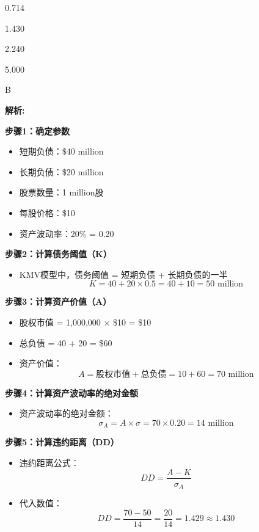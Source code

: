 \documentclass{article}
\newenvironment{explanation}
{\textbf{解析:}\par}
{\par}
\begin{document}
\begin{choices}
    \item 0.714
    \item 1.430
    \item 2.240
    \item 5.000
\end{choices}

\begin{correctanswer}
    B
\end{correctanswer}

\begin{explanation}
   
    
    \textbf{步骤1：确定参数}
    \begin{itemize}
        \item 短期负债：\$40 million
        \item 长期负债：\$20 million
        \item 股票数量：1 million股
        \item 每股价格：\$10
        \item 资产波动率：20\% = 0.20
    \end{itemize}

    \textbf{步骤2：计算债务阈值（K）}
    \begin{itemize}
        \item KMV模型中，债务阈值 = 短期负债 + 长期负债的一半
        \[
        K = 40 + 20 \times 0.5 = 40 + 10 = 50 \text{ million}
        \]
    \end{itemize}

    \textbf{步骤3：计算资产价值（A）}
    \begin{itemize}
        \item 股权市值 = 1{,}000{,}000 × \$10 = \$10 
        \item 总负债 = 40 + 20 = \$60 
        \item 资产价值：
        \[
        A = \text{股权市值} + \text{总负债} = 10 + 60 = 70 \text{ million}
        \]
    \end{itemize}

    \textbf{步骤4：计算资产波动率的绝对金额}
    \begin{itemize}
        \item 资产波动率的绝对金额：
        \[
        \sigma_A = A \times \sigma = 70 \times 0.20 = 14 \text{ million}
        \]
    \end{itemize}

    \textbf{步骤5：计算违约距离（DD）}
    \begin{itemize}
        \item 违约距离公式：
        \[
        DD = \frac{A - K}{\sigma_A}
        \]
        \item 代入数值：
        \[
        DD = \frac{70 - 50}{14} = \frac{20}{14} = 1.429 \approx 1.430
        \]
    \end{itemize}

\end{explanation}
\end{document}

